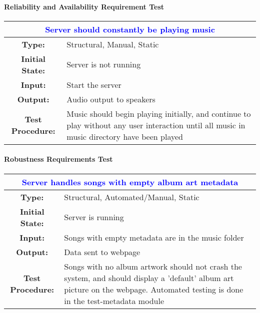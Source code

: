 \documentclass[12pt, titlepage]{article}
\begin{document}
\paragraph{Reliability and Availability Requirement Test}

\begin{center}
\begin{table}[H]
\begin{tabularx}{\textwidth}{| c X |}
\hline
\multicolumn{2}{|c|}{\textbf{\textcolor{blue}{Server should constantly be playing music}}}\\
\hline
\textbf{Type: } & Structural, Manual, Static\\
\textbf{Initial State: } & Server is not running\\
\textbf{Input: } & Start the server\\
\textbf{Output: } & Audio output to speakers \\
\textbf{Test Procedure:  } & Music should begin playing initially, and continue to play without any user interaction until all music in music directory have been played \\
\hline
\end{tabularx}
\end{table}
\end{center}

\paragraph{Robustness Requirements Test}

\begin{center}
\begin{table}[H]
\begin{tabularx}{\textwidth}{| c X |}
\hline
\multicolumn{2}{|c|}{\textbf{\textcolor{blue}{Server handles songs with empty album art metadata}}}\\
\hline
\textbf{Type: } & Structural, Automated/Manual, Static\\
\textbf{Initial State: } & Server is running\\
\textbf{Input: } & Songs with empty metadata are in the music folder\\
\textbf{Output: } & Data sent to webpage \\
\textbf{Test Procedure:  } & Songs with no album artwork should not crash the system, and should display a 'default' album art picture on the webpage. Automated testing is done in the test-metadata module \\
\hline
\end{tabularx}
\end{table}
\end{center}
\end{document}
